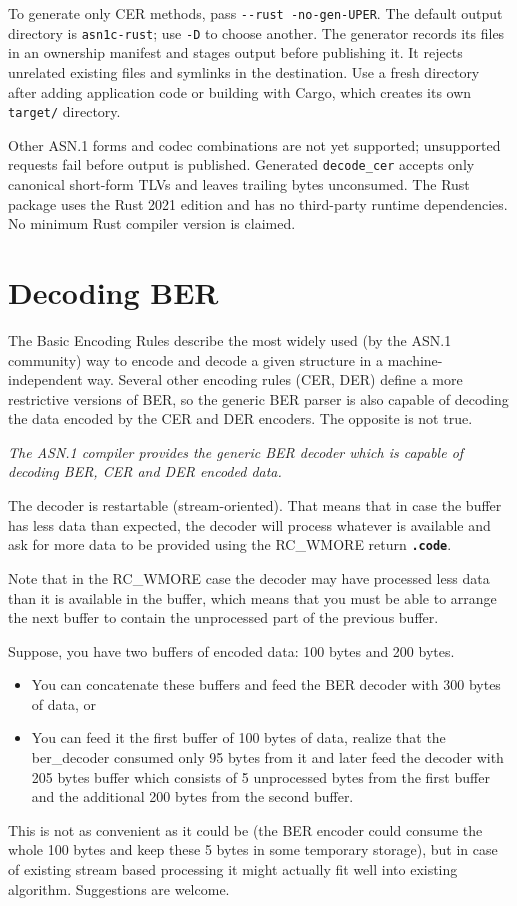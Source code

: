 \documentclass[english,oneside,12pt]{book}
\newcommand{\code}[1]{\texttt{\textbf{\lstinline{#1}}}}
\begin{document}
To generate only CER methods, pass \texttt{-{}-rust -no-gen-UPER}. The default
output directory is \texttt{asn1c-rust}; use \texttt{-D} to choose another.
The generator records its files in an ownership manifest and stages output
before publishing it. It rejects unrelated existing files and symlinks in the
destination. Use a fresh directory after adding application code or building
with Cargo, which creates its own \texttt{target/} directory.

Other ASN.1 forms and codec combinations are not yet supported; unsupported requests
fail before output is published. Generated \texttt{decode\_cer} accepts only
canonical short-form TLVs and leaves trailing bytes unconsumed. The Rust
package uses the Rust 2021 edition and has no third-party runtime dependencies.
No minimum Rust compiler version is claimed.

\section{\label{sec:Decoding-BER}Decoding BER}

The Basic Encoding Rules describe the most widely used (by the ASN.1
community) way to encode and decode a given structure in a machine-independent
way. Several other encoding rules (CER, DER) define a more restrictive
versions of BER, so the generic BER parser is also capable of decoding
the data encoded by the CER and DER encoders. The opposite is not true.

\emph{The ASN.1 compiler provides the generic BER decoder which is
capable of decoding BER, CER and DER encoded data.}

The decoder is restartable (stream-oriented).
That means that in case the buffer has less data than expected,
the decoder will process whatever is available and ask for more data
to be provided using the RC\_WMORE return \code{.code}.

Note that in the RC\_WMORE case the decoder may have processed less data than
it is available in the buffer, which means that you must be able to arrange
the next buffer to contain the unprocessed part of the previous buffer.

Suppose, you have two buffers of encoded data: 100 bytes and 200 bytes.
\begin{itemize}
\item You can concatenate these buffers and feed the BER decoder with 300
bytes of data, or
\item You can feed it the first buffer of 100 bytes of data, realize that
the ber\_decoder consumed only 95 bytes from it and later feed the
decoder with 205 bytes buffer which consists of 5 unprocessed bytes
from the first buffer and the additional 200 bytes from the second
buffer.
\end{itemize}
This is not as convenient as it could be (the BER encoder could
consume the whole 100 bytes and keep these 5 bytes in some temporary
storage), but in case of existing stream based processing it might
actually fit well into existing algorithm. Suggestions are welcome.
\end{document}
